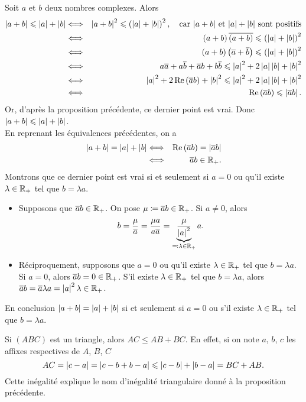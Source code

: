 \documentclass{magnolia}
\begin{document}
\begin{preuve}
Soit $a$ et $b$ deux nombres complexes. Alors
\begin{eqnarray*}
\left|a+b\right|\leqslant\left|a\right|+\left|b\right|
&\Longleftrightarrow& \left|a+b\right|^2\leqslant\left(\left|a\right|+\left|b\right|\right)^2, \quad\text{car $\left|a+b\right|$ et $\left|a\right|+\left|b\right|$ sont positifs}\\
&\Longleftrightarrow& \left(a+b\right)\overline{\left(a+b\right)}\leqslant\left(\left|a\right|+\left|b\right|\right)^2\\
&\Longleftrightarrow& \left(a+b\right)\left(\overline{a}+\overline{b}\right)\leqslant\left(\left|a\right|+\left|b\right|\right)^2\\
&\Longleftrightarrow& a\overline{a}+a\overline{b}+\overline{a}b+b\overline{b}\leqslant\left|a\right|^2+2\left|a\right|\left|b\right|+\left|b\right|^2\\
&\Longleftrightarrow& \left|a\right|^2+2\mathop{\rm Re}\left(\overline{a}b\right)+\left|b\right|^2\leqslant\left|a\right|^2+2\left|a\right|\left|b\right|+\left|b\right|^2\\
&\Longleftrightarrow& \mathop{\rm Re}\left(\overline{a}b\right)\leqslant \left|\overline{a}b\right|.
\end{eqnarray*}
Or, d'après la proposition précédente, ce dernier point est vrai. Donc $\left|a+b\right|\leqslant\left|a\right|+\left|b\right|$.\\

En reprenant les équivalences précédentes, on a
\begin{eqnarray*}
\left|a+b\right|=\left|a\right|+\left|b\right|
&\Longleftrightarrow& \mathop{\rm Re}\left(\overline{a}b\right)= \left|\overline{a}b\right|\\
&\Longleftrightarrow& \overline{a}b\in\mathbb{R}_+.
\end{eqnarray*}
Montrons que ce dernier point est vrai si et seulement si $a=0$ ou qu'il existe $\lambda\in\mathbb{R}_+$ tel que $b=\lambda a$.
\begin{itemize}
\item Supposons que $\overline{a}b\in\mathbb{R}_+$. On pose $\mu\coloneqq\overline{a}b\in\mathbb{R}_+$. Si $a\neq 0$, alors
\[b=\frac{\mu}{\overline{a}}=\frac{\mu a}{a\overline{a}}=\underbrace{\frac{\mu}{\left|a\right|^2}}_{\eqqcolon\lambda\in\mathbb{R}_+}a.\]
\item Réciproquement, supposons que $a=0$ ou qu'il existe $\lambda\in\mathbb{R}_+$ tel que $b=\lambda a$. Si $a=0$, alors $\overline{a}b=0\in\mathbb{R}_+$. S'il existe $\lambda\in\mathbb{R}_+$ tel que $b=\lambda a$, alors $\overline{a}b=\overline{a}\lambda a=\left|a\right|^2 \lambda\in\mathbb{R}_+$.
\end{itemize}
En conclusion $\left|a+b\right|=\left|a\right|+\left|b\right|$ si et seulement si $a=0$ ou s'il existe $\lambda\in\mathbb{R}_+$ tel que $b=\lambda a$.
\end{preuve}

\begin{remarqueUnique}
\remarque Si $(ABC)$ est un triangle, alors $AC\leq AB+BC$. En effet, si on note $a$, $b$, $c$ les affixes respectives de $A$, $B$, $C$
\[AC=\left|c-a\right|=\left|c-b+b-a\right|\leqslant\left|c-b\right|+\left|b-a\right|=BC+AB.\]
Cette inégalité explique le nom d'inégalité triangulaire donné à la proposition précédente.
\end{remarqueUnique}
\end{document}
